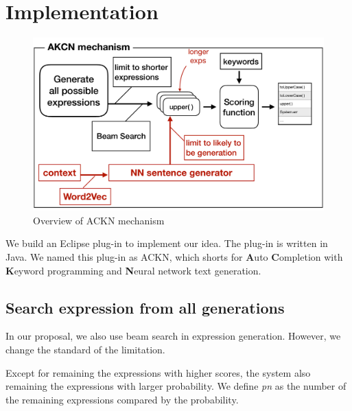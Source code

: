 \documentclass[PRO,english]{ipsj}
\begin{document}


\section{Implementation}\label{sec:implementation}

\begin{figure}[!ht]
\centering
\includegraphics[scale=0.3]{Figure/Overview.pdf}
\caption{Overview of ACKN mechanism}
\label{fig:overview}
\end{figure}

We build an Eclipse plug-in to implement our idea. The plug-in is written in Java. We named this plug-in as ACKN, which shorts for \textbf{A}uto \textbf{C}ompletion with \textbf{K}eyword programming and \textbf{N}eural network text generation.

\subsection{Search expression from all generations}
In our proposal, we also use beam search in expression
generation. However, we change the standard of the limitation. 

Except for remaining the expressions with higher scores, the system also remaining the expressions with larger probability. We define \emph{pn} as the number of the remaining expressions compared by the probability. 
\end{document}
